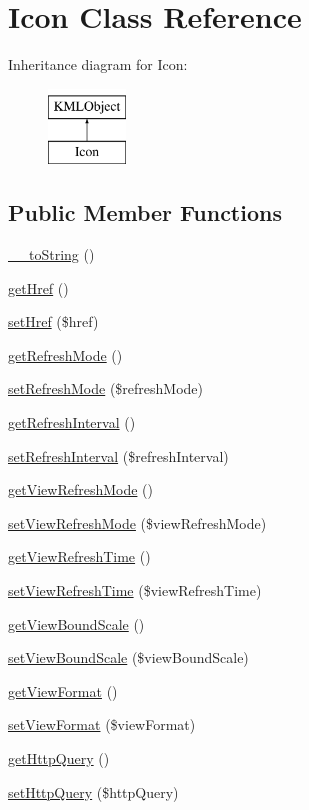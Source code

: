 \hypertarget{classIcon}{
\section{Icon Class Reference}
\label{dc/d25/classIcon}
}
Inheritance diagram for Icon:\begin{figure}[H]
\begin{center}
\leavevmode
\includegraphics[height=2.000000cm]{dc/d25/classIcon}
\end{center}
\end{figure}
\subsection*{Public Member Functions}
\begin{DoxyCompactItemize}
\item 
\hyperlink{classIcon_abcc276a6e123f968464d55da78ed1a1b}{\_\-\_\-toString} ()
\item 
\hyperlink{classIcon_aad38dabf0a0ae7c5fc0eb4bb883293e4}{getHref} ()
\item 
\hyperlink{classIcon_aeac2ad5258bb73084c6984117927664e}{setHref} (\$href)
\item 
\hyperlink{classIcon_ac16e2242d2c113c176e5c20810114d8a}{getRefreshMode} ()
\item 
\hyperlink{classIcon_a3e82046a3910265bd21be67c347f2e1f}{setRefreshMode} (\$refreshMode)
\item 
\hyperlink{classIcon_ad17bdf1198db8f9b8b134667e493caef}{getRefreshInterval} ()
\item 
\hyperlink{classIcon_adbabc34528430ef8d84e07e3c5081d03}{setRefreshInterval} (\$refreshInterval)
\item 
\hyperlink{classIcon_adaa8dc16d3718d50a75bbcf42b543ec9}{getViewRefreshMode} ()
\item 
\hyperlink{classIcon_a5c3678845ffedefcd9c19bdd6af8964a}{setViewRefreshMode} (\$viewRefreshMode)
\item 
\hyperlink{classIcon_a80fbbabea4afb5bcc93111d1c7d72d7f}{getViewRefreshTime} ()
\item 
\hyperlink{classIcon_aa380009321cb43c3091d6b57b2584f42}{setViewRefreshTime} (\$viewRefreshTime)
\item 
\hyperlink{classIcon_a9ba231b572e08d154c95985764d99963}{getViewBoundScale} ()
\item 
\hyperlink{classIcon_a9da9a41eb5174b97dd5a9b58c03fe414}{setViewBoundScale} (\$viewBoundScale)
\item 
\hyperlink{classIcon_a81220e5d6d5d073a47169294e12f28b3}{getViewFormat} ()
\item 
\hyperlink{classIcon_a2ddeb0ad14b4ebdfde7a5eea6861547c}{setViewFormat} (\$viewFormat)
\item 
\hyperlink{classIcon_a40e7452542d846030f8b6f08d989ee8e}{getHttpQuery} ()
\item 
\hyperlink{classIcon_abbb516452c27f3111d87ef61f499c842}{setHttpQuery} (\$httpQuery)
\end{DoxyCompactItemize}


